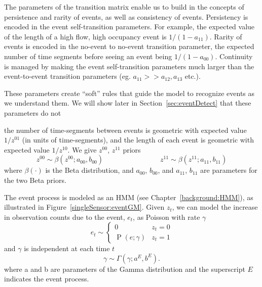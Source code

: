 \documentclass[12pt]{report}
\DeclareMathOperator{\poisson}{P} %
\newcounter{time}
\begin{document}
The parameters of the transition matrix enable us to build in the
concepts of persistence and rarity of events, as well as consistency
of events.  Persistency is encoded in the event self-transition
parameters. For example, the expected value of the length of a {high
  flow, high occupancy} event is $1/(1-a_{11})$.  Rarity of events is
encoded in the no-event to no-event transition parameter, the expected
number of time segments before seeing an event being $1/(1-a_{00})$.
Continuity is managed by making the event self-transition parameters
much larger than the event-to-event transition parameters (eg. $a_{11}
>> a_{12}, a_{13}$ etc.).

These parameters create ``soft'' rules that guide the model to
recognize events as we understand them.  We will show later in
Section~\ref{sec:eventDetect} that these parameters do not






the number of time-segments between events is geometric with expected
value $1/z^{01}$ (in units of time-segments), and the length of each
event is geometric with expected value $1/z^{10}$.  We give $z^{00}$,
$z^{11}$ priors
\begin{equation}
 z^{00} \sim \beta(z^{00};a_{00},b_{00}) \qquad \qquad \qquad \qquad
 z^{11} \sim \beta(z^{11};a_{11},b_{11})
\end{equation}
where $\beta(\cdot)$ is the Beta distribution, and $a_{00}$, $b_{00}$, and $a_{11}$, $b_{11}$ are parameters for the two Beta priors.

The event process is modeled as an HMM (see
Chapter~\ref{background:HMM}), as illustrated in
Figure~\ref{singleSensor:eventGM}.  Given $z_t$, we can model the
increase in observation counts due to the event, $e_t$, as Poisson
with rate $\gamma$
\begin{equation}
 e_t \sim \begin{cases} 0 & z_t = 0 \\ \poisson(e ; \gamma) & z_t = 1 \end{cases}
\end{equation}\label{singleSensor:eventCount1}
and $\gamma$ is independent at each time $t$
\begin{equation}
 \gamma \sim \Gamma(\gamma ; a^E, b^E).
\end{equation}\label{singleSensor:eventCount2}
where a and b are parameters of the Gamma distribution and the
superscript $E$ indicates the event process.
\end{document}
